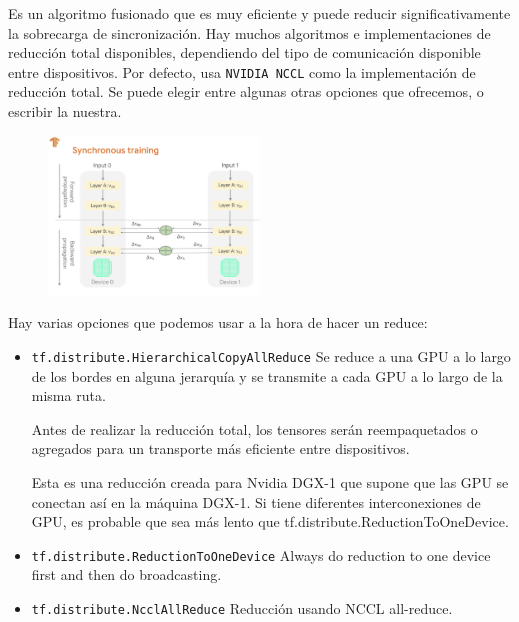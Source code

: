 \documentclass[10pt, fleqn, journal]{IEEEtran}
\theoremstyle{break}                                            %
\begin{document}
      Es un algoritmo fusionado que es muy eficiente y puede reducir significativamente la sobrecarga de sincronización. 
      Hay muchos algoritmos e implementaciones de reducción total disponibles, dependiendo del tipo de 
      comunicación disponible entre dispositivos. Por defecto, usa \texttt{NVIDIA NCCL} como la implementación 
      de reducción total. Se puede elegir entre algunas otras opciones que ofrecemos, o escribir la nuestra.

      \begin{figure}[ht!]
        \centering
        \includegraphics[width=0.5\textwidth]{syn}
      \end{figure}
      
      Hay varias opciones que podemos usar a la hora de hacer un reduce:

      \begin{itemize}
        \item \texttt{tf.distribute.HierarchicalCopyAllReduce}
          Se reduce a una GPU a lo largo de los bordes en alguna jerarquía y se
          transmite a cada GPU a lo largo de la misma ruta. 
           
          Antes de realizar la reducción total, los tensores serán reempaquetados o
          agregados para un transporte más eficiente entre dispositivos.

          Esta es una reducción creada para Nvidia DGX-1 que supone que las GPU se conectan 
          así en la máquina DGX-1. Si tiene diferentes interconexiones de GPU, 
          es probable que sea más lento que tf.distribute.ReductionToOneDevice.

        \item \texttt{tf.distribute.ReductionToOneDevice}
          Always do reduction to one device first and then do broadcasting.

        \item \texttt{tf.distribute.NcclAllReduce}
          Reducción usando NCCL all-reduce.
      \end{itemize}
      
\end{document}
